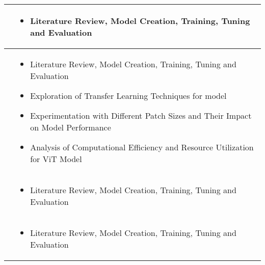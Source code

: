 \begin{longtable}{p{5cm}|p{9.5cm}}
    \nameref{ss:lhsj} &
        \begin{itemize}
            \item \nameref{s:vit} Literature Review, Model Creation, Training, Tuning and Evaluation
        \end{itemize}\\
        \hline

    \nameref{ss:lhsj} &
    \begin{itemize}
        \item \nameref{s:vit} Literature Review, Model Creation, Training, Tuning and Evaluation
        \item Exploration of Transfer Learning Techniques for \nameref{s:vit} model
        \item Experimentation with Different Patch Sizes and Their Impact on Model Performance
        \item Analysis of Computational Efficiency and Resource Utilization for ViT Model
    \end{itemize}\\
    \hline
    
    \nameref{ss:ozxm} &
        \begin{itemize}
            \item \nameref{s:xception} Literature Review, Model Creation, Training, Tuning and Evaluation
        \end{itemize}\\
        \hline
    
    \nameref{ss:ctsh} &
        \begin{itemize}
            \item \nameref{s:densenet121} Literature Review, Model Creation, Training, Tuning and Evaluation
        \end{itemize}\\
    \hline
\end{longtable}
